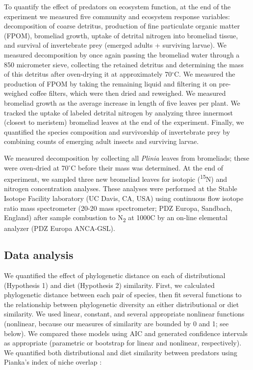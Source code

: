 \documentclass[11pt]{article}
\begin{document}
To quantify the effect of predators on ecosystem function, at the end of
the experiment we measured five community and ecosystem response
variables: decomposition of coarse detritus, production of fine
particulate organic matter (FPOM), bromeliad growth, uptake of detrital
nitrogen into bromeliad tissue, and survival of invertebrate prey
(emerged adults + surviving larvae). We measured decomposition by once
again passing the bromeliad water through a 850 micrometer sieve, collecting the
retained detritus and determining the mass of this detritus after
oven-drying it at approximately 70\(^\circ\)C. We measured the
production of FPOM by taking the remaining liquid and filtering it on
pre-weighed coffee filters, which were then dried and reweighed. We
measured bromeliad growth as the average increase in length of five
leaves per plant. We tracked the uptake of labeled detrital nitrogen by
analyzing three innermost (closest to meristem) bromeliad leaves at the
end of the experiment. Finally, we quantified the species composition
and survivorship of invertebrate prey by combining counts of emerging
adult insects and surviving larvae.

We measured decomposition by collecting all \emph{Plinia} leaves from
bromeliads; these were oven-dried at 70\(^\circ\)C before their mass was
determined. At the end of experiment, we sampled three new bromeliad
leaves for isotopic (\textsuperscript{15}N) and nitrogen concentration
analyses. These analyses were performed at the Stable Isotope Facility
laboratory (UC Davis, CA, USA) using continuous flow isotope ratio mass
spectrometer (20-20 mass spectrometer; PDZ Europa, Sandbach, England)
after sample combustion to N\textsubscript{2} at 1000C by an on-line
elemental analyzer (PDZ Europa ANCA-GSL).

\subsection*{Data analysis}

We quantified the effect of phylogenetic distance on each of
distributional (Hypothesis 1) and diet (Hypothesis 2) similarity. First,
we calculated phylogenetic distance between each pair of species, then
fit several functions to the relationship between phylogenetic diversity
an either distributional or diet similarity. We used linear, constant,
and several appropriate nonlinear functions (nonlinear, because our
measures of similarity are bounded by 0 and 1; see below). We compared
these models using AIC and generated confidence intervals as appropriate
(parametric or bootstrap for linear and nonlinear, respectively). We
quantified both distributional and diet similarity between predators
using Pianka's index of niche overlap \citealt{Pianka1974}:
\end{document}
